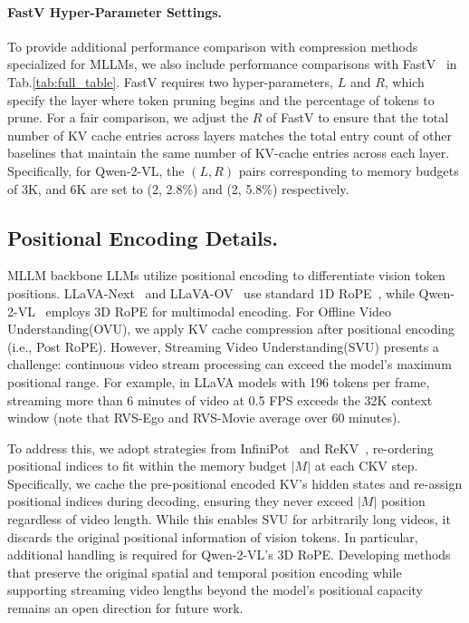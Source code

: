 \paragraph{FastV Hyper-Parameter Settings.} To provide additional performance comparison with compression methods specialized for MLLMs, we also include performance comparisons with FastV~\cite{chen2024image} in Tab.\ref{tab:full_table}. FastV requires two hyper-parameters, $L$ and $R$, which specify the layer where token pruning begins and the percentage of tokens to prune. For a fair comparison, we adjust the $R$ of FastV to ensure that the total number of KV cache entries across layers matches the total entry count of other baselines that maintain the same number of KV-cache entries across each layer.  Specifically, for Qwen-2-VL, the $(L, R)$ pairs corresponding to memory budgets of 3K, and 6K are set to (2, 2.8\%) and (2, 5.8\%) respectively.

\subsection{Positional Encoding Details.} MLLM backbone LLMs utilize positional encoding to differentiate vision token positions. LLaVA-Next~\cite{zhang2024llavanext-video} and LLaVA-OV~\cite{li2024llava} use standard 1D RoPE~\cite{su2023roformerenhancedtransformerrotary}, while Qwen-2-VL~\cite{Qwen2VL} employs 3D RoPE for multimodal encoding. For Offline Video Understanding(OVU), we apply KV cache compression after positional encoding (i.e., Post RoPE). However, Streaming Video Understanding(SVU) presents a challenge: continuous video stream processing can exceed the model's maximum positional range. For example, in LLaVA models with 196 tokens per frame, streaming more than 6 minutes of video at 0.5 FPS exceeds the 32K context window (note that RVS-Ego and RVS-Movie average over 60 minutes). 

To address this, we adopt strategies from InfiniPot~\cite{kim-etal-2024-infinipot} and ReKV~\cite{Shangzhe2025streaming}, re-ordering positional indices to fit within the memory budget $|M|$ at each CKV step. Specifically, we cache the pre-positional encoded KV's hidden states and re-assign positional indices during decoding, ensuring they never exceed $|M|$ position regardless of video length. While this enables SVU for arbitrarily long videos, it discards the original positional information of vision tokens. In particular, additional handling is required for Qwen-2-VL’s 3D RoPE. Developing methods that preserve the original spatial and temporal position encoding while supporting streaming video lengths beyond the model’s positional capacity remains an open direction for future work.


